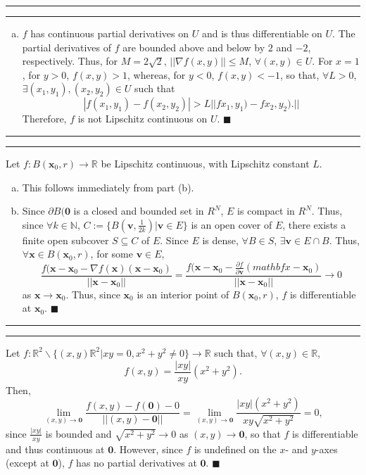 \documentclass[11pt]{article}
\newcounter{questionCounter}
\newcounter{partCounter}[questionCounter]
\newenvironment{question}[2][\arabic{questionCounter}]{%
    \setcounter{partCounter}{0}%
    \vspace{.25in} \hrule \vspace{0.5em}%
        \noindent{\bf #2}%
    \vspace{0.8em} \hrule \vspace{.10in}%
    \addtocounter{questionCounter}{1}%
}{}
\begin{document}
\begin{question}{Problem 1}
\begin{enumerate}[(a)]
\item $f$ has continuous partial derivatives on $U$ and is thus differentiable
on $U$. The partial derivatives of $f$ are bounded above and below by $2$ and
$-2$, respectively. Thus, for $M = 2\sqrt{2}$, $||\nabla f (x,y)|| \leq M$,
$\forall (x,y) \in U$. For $x = 1$, for $y > 0$, $f(x,y) > 1$, whereas, for
$y < 0$, $f(x,y) < -1$, so that, $\forall L > 0$,
$\exists (x_1,y_1),(x_2,y_2) \in U$ such that
\[|f(x_1,y_1) - f(x_2,y_2)| > L||fx_1,y_1) - fx_2,y_2).||\] Therefore, $f$ is
not Lipschitz continuous on $U$. \qquad $\blacksquare$
\end{enumerate}
\end{question}

\begin{question}{Problem 2}
Let $f : B(\mathbf{x}_0, r) \rightarrow \mathbb{R}$ be Lipschitz continuous,
with Lipschitz constant $L$.
\begin{enumerate}[(a)]
\item This follows immediately from part (b).

\item Since $\partial B(\mathbf{0}$ is a closed and bounded set in $R^N$, $E$ is compact in $R^N$.
Thus, since $\forall k \in \mathbb{N}$, $C := \{B(\mathbf{v}, \frac{1}{2k}) |
\mathbf{v} \in E\}$ is an open cover of $E$, there exists a finite open
subcover $S \subseteq C$ of $E$. Since $E$ is dense, $\forall B \in S$,
$\exists \mathbf{v} \in E \cap B$. Thus, $\forall \mathbf{x} \in B(\mathbf{x}_0,r)$, for some $\mathbf{v} \in E$,
\[\frac{f(\mathbf{x} - \mathbf{x}_0 - \nabla f(\mathbf{x}) (\mathbf{x} - \mathbf{x}_0)}{||\mathbf{x} - \mathbf{x}_0||}
= \frac{f(\mathbf{x} - \mathbf{x}_0 - \frac{\partial f}{\partial \mathbf{v}} (mathbf{x} - \mathbf{x}_0)}{||\mathbf{x} - \mathbf{x}_0||}
 \rightarrow 0\]
as $\mathbf{x} \rightarrow \mathbf{x}_0$. Thus, since $\mathbf{x}_0$ is an interior point of $B(\mathbf{x}_0, r)$,
$f$ is differentiable at $\mathbf{x}_0$. \qquad $\blacksquare$
\end{enumerate}
\end{question}

\begin{question}{Problem 3} Let
$f: \mathbb{R}^2 \backslash \{(x,y) \mathbb{R}^2 | xy = 0, x^2 + y^2 \neq 0\}
    \rightarrow \mathbb{R}$ such
that, $\forall (x,y) \in \mathbb{R}$, \[f(x,y) = \frac{|xy|}{xy} (x^2 + y^2).\]
Then,
\[
\lim_{(x,y) \rightarrow \mathbf{0}}
    \frac{f(x,y) - f(\mathbf{0}) - 0}
        {||(x,y) - \mathbf{0}||}
 =
\lim_{(x,y) \rightarrow \mathbf{0}}
    \frac{|xy|(x^2 + y^2)}{xy \sqrt{x^2 + y^2}}
 = 0,\]
since $\frac{|xy|}{xy}$ is bounded and $\sqrt{x^2 + y^2} \rightarrow 0$ as
$(x,y) \rightarrow \mathbf{0}$,
so that $f$ is differentiable and thus continuous at $\mathbf{0}$.
However, since $f$ is undefined on the $x$- and $y$-axes (except at $\mathbf{0}$),
$f$ has no partial derivatives at $\mathbf{0}$. \qquad $\blacksquare$

\end{question}
\end{document}
